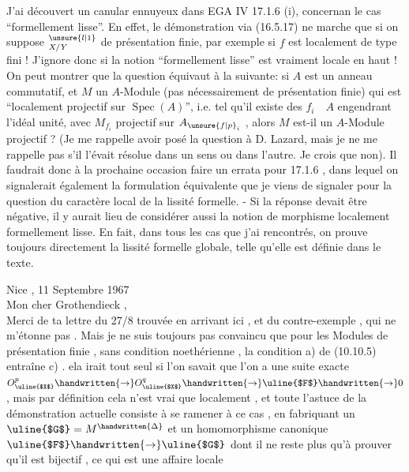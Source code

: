 J'ai découvert un canular ennuyeux dans EGA IV 17.1.6 (i), concernan le cas ``formellement lisse''. En effet, le démonstration via (16.5.17) ne marche que si on suppose ${}^{\unsure{l|1}}_{X/Y}$ de présentation finie, par exemple si $f$ est localement de  type fini ! J'ignore donc si la notion ``formellement lisse'' est vraiment locale en haut ! On peut montrer que la question équivaut à la suivante: si $A$ est un anneau commutatif, et $M$ un $A$-Module (pas nécessairement de présentation finie) qui est ``localement projectif sur $\operatorname{Spec}(A)$'', i.e. tel qu'il existe des $f_i\quad A$ engendrant l'idéal unité, avec $M_{f_i}$ projectif sur $A_{\unsure{f|p}_i}$ , alors $M$ est-il un $A$-Module projectif ? (Je me rappelle avoir posé la question à D. Lazard, mais je ne me rappelle pas s'il l'évait résolue dans un sens ou dans l'autre. Je crois que non). Il faudrait donc à la prochaine occasion faire un errata pour 17.1.6 , dans lequel on  signalerait également la formulation équivalente que je viens de signaler pour la question du caractère local de la lissité formelle. - Si la réponse devait être négative, il y aurait lieu de considérer aussi la notion de morphisme localement formellement lisse. En fait, dans tous les cas que j'ai rencontrés,  on prouve toujours directement la lissité formelle globale, telle qu'elle est définie dans le texte.

Nice , 11 Septembre 1967\\

Mon cher Grothendieck ,\\

Merci de ta lettre du 27/8 trouvée en arrivant ici , et du contre-exemple , qui ne m'étonne pas . Mais je ne suis toujours pas convaincu que pour les Modules de présentation finie , sans condition noethérienne , la condition a) de (10.10.5) entraîne c) . ela irait tout seul si l'on savait que l'on a une suite exacte $O_{\text{\uline{$X$}}}^{p}\handwritten{\to}O_{\text{\uline{$X$}}}^{q}\handwritten{\to}\text{\uline{$F$}}\handwritten{\to}0$ , mais par définition cela  n'est vrai que localement , et toute l'astuce de la démonstration actuelle consiste à se ramener à ce cas , en fabriquant un $\text{\uline{$G$}}=M^{\handwritten{\Delta}}$ et un homomorphisme canonique $\text{\uline{$F$}}\handwritten{\to}\text{\uline{$G$}}$ dont il ne reste plus qu'à prouver qu'il est bijectif , ce qui est une affaire locale

